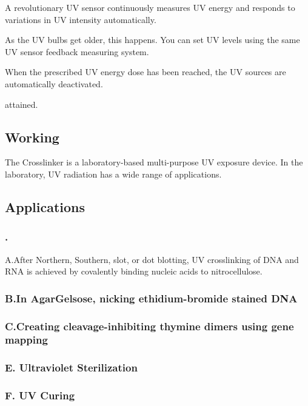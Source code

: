 \documentclass[12pt]{article}
\begin{document}
A revolutionary UV sensor continuously measures UV energy and responds to variations in UV intensity automatically.

As the UV bulbs get older, this happens. You can set UV levels using the same UV sensor feedback measuring system.

When the prescribed UV energy dose has been reached, the UV sources are automatically deactivated.

attained.


\subsection{Working}

The Crosslinker is a laboratory-based multi-purpose UV exposure device. In the laboratory, UV radiation has a wide range of applications.

\subsection{Applications}


 
\subsubsection{.}

A.After Northern, Southern, slot, or dot blotting, UV crosslinking of DNA and RNA is achieved by covalently binding nucleic acids to nitrocellulose.

\subsubsection{B.In AgarGelsose, nicking ethidium-bromide stained DNA} 

\subsubsection{C.Creating cleavage-inhibiting thymine dimers using gene mapping}


\subsubsection{E. Ultraviolet Sterilization}

\subsubsection{F. UV Curing}
\end{document}

